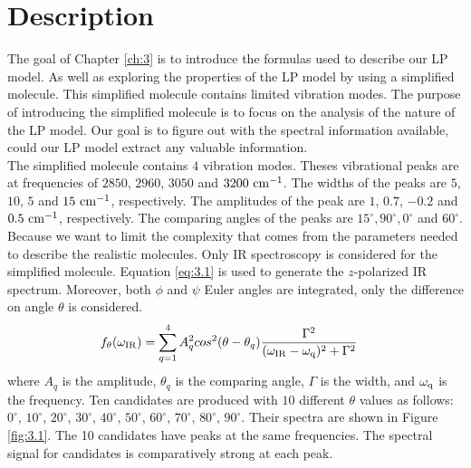  \label{ch:3}

\section{Description}
The goal of Chapter \ref{ch:3} is to introduce the formulas used to describe our LP model. As well as exploring the properties of the LP model by using a simplified molecule. This simplified molecule contains limited vibration modes. The purpose of introducing the simplified molecule is to focus on the analysis of the nature of the LP model. Our goal is to figure out with the spectral information available, could our LP model extract any valuable information. \\

The simplified molecule contains $4$ vibration modes. Theses vibrational peaks are at frequencies of $2850$, $2960$, $3050$ and $3200~\rm cm^{-1}$. The widths of the peaks are $5$, $10$, $5$ and $15~\rm cm^{-1}$, respectively. The amplitudes of the peak are $1$, $0.7$, $-0.2$ and $0.5~\rm cm^{-1}$, respectively. The comparing angles of the peaks are $15^{\circ}, 90^{\circ}, 0^{\circ}$ and $60^{\circ}$. \\

Because we want to limit the complexity that comes from the parameters needed to describe the realistic molecules. Only IR spectroscopy is considered for the simplified molecule. Equation \ref{eq:3.1} is used to generate the $z$-polarized IR spectrum. Moreover, both $\phi$ and $\psi$ Euler angles are integrated, only the difference on angle $\theta$ is considered. \\

\begin{eqnarray} \label{eq:3.1}
& f_{\theta}(\omega_{\rm IR}) = \displaystyle\sum^{4}_{q=1} A_q^2 cos^2(\theta - \theta_q)\frac{\Gamma^2}{(\omega_{\rm IR}- \omega_{\rm q})^2 + \Gamma^2} 
\end{eqnarray}
where $A_{q}$ is the amplitude, $\theta_{q}$ is the comparing angle, $\Gamma$ is the width, and $\omega_{\rm q}$ is the frequency. Ten candidates are produced with $10$ different $\theta$ values as follows: $0^{\circ}$, $10^{\circ}$, $20^{\circ}$, $30^{\circ}$, $40^{\circ}$, $50^{\circ}$, $60^{\circ}$, $70^{\circ}$, $80^{\circ}$, $90^{\circ}$. Their spectra are shown in Figure \ref{fig:3.1}. The 10 candidates have peaks at the same frequencies. The spectral signal for candidates is comparatively strong at each peak. \\

